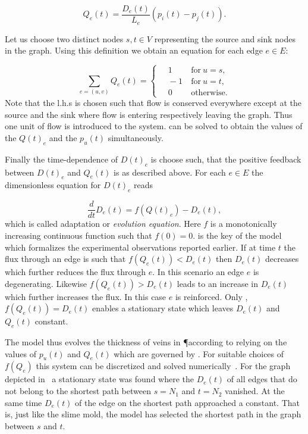 			\begin{equation}
				Q_e(t) = \frac{D_e(t)}{L_e} (p_i(t) - p_j(t)).
				\label{eq:flow}
			\end{equation}

			Let us choose two distinct nodes $s, t \in V$ representing the source and sink nodes in the graph. Using this definition we obtain an equation for each edge $e \in E$:

			\begin{equation}
				\sum_{e = (u,v) } Q_e(t) =
				\begin{cases}
				\quad 1 & \ \text{for} \ u=s, \\
				\quad -1 & \ \text{for} \ u=t, \\
				\quad 0 & \ \text{otherwise}.
				\end{cases}
				\label{eq:conservation_of_flow}
			\end{equation}
			Note that the l.h.s is chosen such that flow is conserved everywhere except at the source and the sink where flow is entering respectively leaving the graph. Thus one unit of flow is introduced to the system.  can be solved to obtain the values of the $Q(t)_e$ and the $p_u(t)$ simultaneously.

			Finally the time-dependence of $D(t)_e$ is choose such, that the positive feedback between $D(t)_e$ and $Q_e(t)$ is as described above. For each $e \in E$ the dimensionless equation for $D(t)_e$ reads

			\begin{equation}
				\frac{d}{dt} D_e(t) = f( Q(t)_e ) - D_e(t),
				\label{eq:evolution}
			\end{equation}
			which is called adaptation or \emph{evolution equation}. Here $f$ is a monotonically increasing continuous function such that $f(0) = 0$.  is the key of the model which formalizes the experimental observations reported earlier. If at time $t$ the flux through an edge is such that $f(Q_e(t)) < D_e(t)$ then $D_e(t)$ decreases which further reduces the flux through $e$. In this scenario an edge $e$ is degenerating. Likewise $f(Q_e(t)) > D_e(t)$ leads to an increase in $D_e(t)$ which further increases the flux. In this case $e$ is reinforced. Only ,$f(Q_e(t)) = D_e(t)$ enables a stationary state which leaves $D_e(t)$ and $Q_e(t)$ constant. 

			The model thus evolves the thickness of veins in \P according to  relying on the values of $p_u(t)$ and $Q_e(t)$ which are governed by . For suitable choices of $f(Q_e)$ this system can be discretized and solved numerically~\cite{Tero2006115}. For the graph depicted in~ a stationary state was found where the $D_e(t)$ of all edges that do not belong to the shortest path between $s=N_1$ and $t=N_2$ vanished. At the same time $D_e(t)$ of the edge on the shortest path approached a constant. That is, just like the slime mold, the model has selected the shortest path in the graph between $s$ and $t$. 

